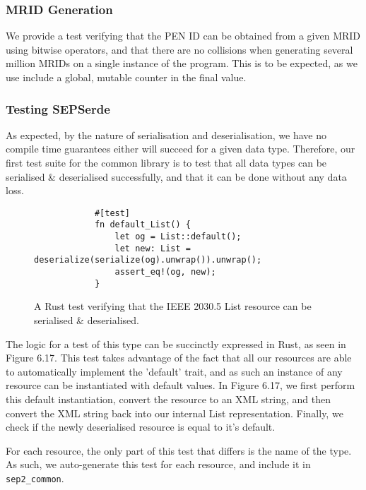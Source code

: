 \subsubsection{MRID Generation}
We provide a test verifying that the PEN ID can be obtained from a given MRID using bitwise operators, and that there are no collisions when generating several million MRIDs on a single instance of the program. This is to be expected, as we use include a global, mutable counter in the final value.

\subsubsection{Testing SEPSerde}
As expected, by the nature of serialisation and deserialisation, we have no compile time guarantees either will succeed for a given data type.
Therefore, our first test suite for the common library is to test that all data types can be serialised \& deserialised successfully, and that it can be done without any data loss.

\begin{figure}[h]
    \begin{center}
        \begin{lstlisting}
            #[test]
            fn default_List() {
                let og = List::default();
                let new: List = deserialize(serialize(og).unwrap()).unwrap();
                assert_eq!(og, new);
            }
        \end{lstlisting}
        \label{fig:yaserdetest}
        \vspace{-10pt}
        \caption{A Rust test verifying that the IEEE 2030.5 List resource can be serialised \& deserialised.}
    \end{center}
\end{figure}

The logic for a test of this type can be succinctly expressed in Rust, as seen in Figure 6.17. 
This test takes advantage of the fact that all our resources are able to automatically implement the 'default' trait, and as such an instance of any resource can be instantiated with default values.
In Figure 6.17, we first perform this default instantiation, convert the resource to an XML string, and then convert the XML string back into our internal List representation. 
Finally, we check if the newly deserialised resource is equal to it's default.

For each resource, the only part of this test that differs is the name of the type. As such, we auto-generate this test for each resource, and include it in \texttt{sep2\_common}.

